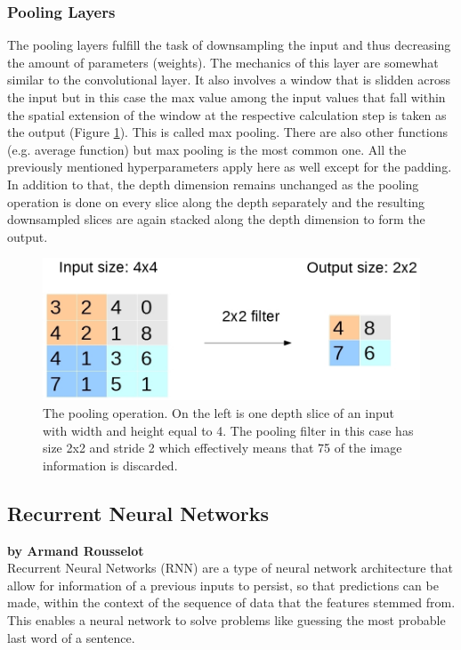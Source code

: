 \documentclass{article}
\begin{document}
\subsubsection{Pooling Layers}
The pooling layers fulfill the task of downsampling the input and thus decreasing the amount of parameters (weights). The mechanics of this layer are somewhat similar to the convolutional layer. It also involves a window that is slidden across the input but in this case the max value among the input values that fall within the spatial extension of the window at the respective calculation step is taken as the output (Figure \ref{fig:Pooling}). This is called max pooling. There are also other functions (e.g. average function) but max pooling is the most common one. All the previously mentioned hyperparameters apply here as well except for the padding. In addition to that, the depth dimension remains unchanged as the pooling operation is done on every slice along the depth separately and the resulting downsampled slices are again stacked along the depth dimension to form the output.
\begin{figure}[H]
\begin{center}
\includegraphics[scale=0.4]{rsz_1pooling}
\end{center}
\caption{The pooling operation. On the left is one depth slice of an input with width and height equal to 4. The pooling filter in this case has size 2x2 and stride 2 which effectively means that 75\text{\%} of the image information is discarded.}
\label{fig:Pooling}
\end{figure}

\subsection{Recurrent Neural Networks}

\textbf{by Armand Rousselot} \\

Recurrent Neural Networks (RNN) are a type of neural network architecture that allow for information of a previous inputs to persist, so that predictions can be made, within the context of the sequence of data that the features stemmed from. This enables a neural network to solve problems like guessing the most probable last word of a sentence\cite{Goodfellow2}.
\end{document}
